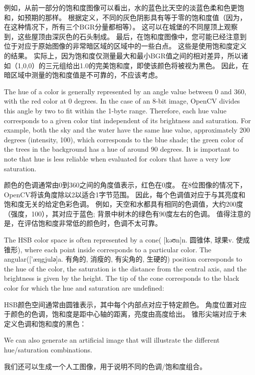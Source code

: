\documentclass[]{article}
\begin{document}
例如，从前一部分的饱和度图像可以看出，水的蓝色比天空的淡蓝色柔和色更饱和，如预期的那样。
根据定义，不同的灰色阴影具有等于零的饱和度值（因为，在这种情况下，所有三个BGR分量都相等）。
这可以在城堡的不同屋顶上观察到，这些屋顶由深灰色的石头制成。
最后，在饱和度图像中，您可能已经注意到位于对应于原始图像的非常暗区域的区域中的一些白点。
这些是使用饱和度定义的结果。
实际上，因为饱和度仅测量最大和最小BGR值之间的相对差异，所以诸如（1,0,0）的三元组给出1.0的完美饱和度，即使该颜色将被视为黑色。
因此，在暗区域中测量的饱和度值是不可靠的，不应该考虑。

The hue of a color is generally represented by an angle value between 0
and 360, with the red color at 0 degrees. In the case of an 8-bit image,
OpenCV divides this angle by two to fit within the 1-byte range.
Therefore, each hue value corresponds to a given color tint independent
of its brightness and saturation. For example, both the sky and the
water have the same hue value, approximately 200 degrees (intensity,
100), which corresponds to the blue shade; the green color of the trees
in the background has a hue of around 90 degrees. It is important to
note that hue is less reliable when evaluated for colors that have a
very low saturation.

颜色的色调通常由0到360之间的角度值表示，红色在0度。
在8位图像的情况下，OpenCV将该角度除以2以适合1字节范围。
因此，每个色调值对应于与其亮度和饱和度无关的给定色彩色调。
例如，天空和水都具有相同的色调值，大约200度（强度，100），其对应于蓝色;
背景中树木的绿色有90度左右的色调。
值得注意的是，在评估饱和度非常低的颜色时，色调不太可靠。

The HSB color space is often represented by a cone( {[}kəʊn{]}n. 圆锥体,
球果v. 使成锥形), where each point inside corresponds to a particular
color. The angular({[}'æŋgjulә{]}a. 有角的, 消瘦的, 有尖角的, 生硬的)
position corresponds to the hue of the color, the saturation is the
distance from the central axis, and the brightness is given by the
height. The tip of the cone corresponds to the black color for which the
hue and saturation are undefined:

HSB颜色空间通常由圆锥表示，其中每个内部点对应于特定颜色。
角度位置对应于颜色的色调，饱和度是距中心轴的距离，亮度由高度给出。
锥形尖端对应于未定义色调和饱和度的黑色：

We can also generate an artificial image that will illustrate the
different hue/saturation combinations.

我们还可以生成一个人工图像，用于说明不同的色调/饱和度组合。
\end{document}
